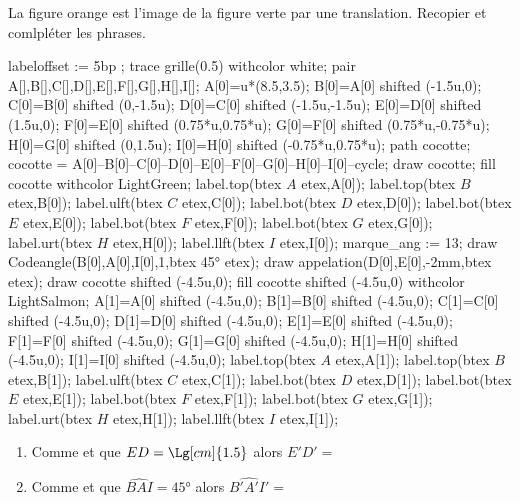 \begin{exercice*}
    La figure orange est l'image de la figure verte par une translation. Recopier et comlpléter les phrases.
    \begin{Geometrie}[CoinHD={(9u,4u)}]
        labeloffset := 5bp ;
        trace grille(0.5) withcolor white;
        pair A[],B[],C[],D[],E[],F[],G[],H[],I[];
        A[0]=u*(8.5,3.5);
        B[0]=A[0] shifted (-1.5u,0);
        C[0]=B[0] shifted (0,-1.5u);
        D[0]=C[0] shifted (-1.5u,-1.5u);
        E[0]=D[0] shifted (1.5u,0);
        F[0]=E[0] shifted (0.75*u,0.75*u);
        G[0]=F[0] shifted (0.75*u,-0.75*u);
        H[0]=G[0] shifted (0,1.5u);
        I[0]=H[0] shifted (-0.75*u,0.75*u);
        path cocotte;
        cocotte = A[0]--B[0]--C[0]--D[0]--E[0]--F[0]--G[0]--H[0]--I[0]--cycle;
        draw cocotte;
        fill cocotte withcolor LightGreen;
        label.top(btex $A$ etex,A[0]);
        label.top(btex $B$ etex,B[0]);
        label.ulft(btex $C$ etex,C[0]);
        label.bot(btex $D$ etex,D[0]);
        label.bot(btex $E$ etex,E[0]);
        label.bot(btex $F$ etex,F[0]);
        label.bot(btex $G$ etex,G[0]);
        label.urt(btex $H$ etex,H[0]);
        label.llft(btex $I$ etex,I[0]);
        marque_ang := 13;
        draw Codeangle(B[0],A[0],I[0],1,btex \ang{45} etex);        
        draw appelation(D[0],E[0],-2mm,btex  etex);
        draw cocotte shifted (-4.5u,0);
        fill cocotte shifted (-4.5u,0) withcolor LightSalmon;
        A[1]=A[0] shifted (-4.5u,0);
        B[1]=B[0] shifted (-4.5u,0);
        C[1]=C[0] shifted (-4.5u,0);
        D[1]=D[0] shifted (-4.5u,0);
        E[1]=E[0] shifted (-4.5u,0);
        F[1]=F[0] shifted (-4.5u,0);
        G[1]=G[0] shifted (-4.5u,0);
        H[1]=H[0] shifted (-4.5u,0);
        I[1]=I[0] shifted (-4.5u,0);
        label.top(btex $A$ etex,A[1]);
        label.top(btex $B$ etex,B[1]);
        label.ulft(btex $C$ etex,C[1]);
        label.bot(btex $D$ etex,D[1]);
        label.bot(btex $E$ etex,E[1]);
        label.bot(btex $F$ etex,F[1]);
        label.bot(btex $G$ etex,G[1]);
        label.urt(btex $H$ etex,H[1]);
        label.llft(btex $I$ etex,I[1]);
    \end{Geometrie}
    \begin{enumerate}
        \item Comme \makebox[0.1\linewidth]{\dotfill} et que $ED=\Lg[cm]{1.5}$ alors $E'D'=$\makebox[0.1\linewidth]{\dotfill}
        \item Comme \makebox[0.1\linewidth]{\dotfill} et que $\widehat{BAI}=\ang{45}$ alors $\widehat{B'A'I'}=$\makebox[0.1\linewidth]{\dotfill}
    \end{enumerate}
\end{exercice*}
